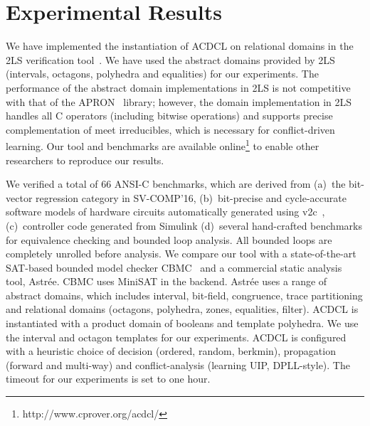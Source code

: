 

\section{Experimental Results}

We have implemented the instantiation of ACDCL on relational domains in the
2LS verification tool~\cite{2ls}.  We have used the abstract domains
provided by 2LS (intervals, octagons, polyhedra and equalities) for our
experiments.  The performance of the abstract domain implementations in 2LS
is not competitive with that of the APRON~\cite{apron} library; however, the
domain implementation in 2LS handles all C operators (including bitwise
operations) and supports precise complementation of meet irreducibles, which
is necessary for conflict-driven learning.  Our tool and benchmarks are
available online\footnote{http://www.cprover.org/acdcl/} to enable other
researchers to reproduce our results.

We verified a total of 66 ANSI-C benchmarks, which are derived from (a)~the
bit-vector regression category in SV-COMP'16, (b)~bit-precise and
cycle-accurate software models of hardware circuits automatically generated
using v2c~\cite{mtk2016}, (c)~controller code generated from Simulink
(d)~several hand-crafted benchmarks for equivalence checking and bounded
loop analysis.  All bounded loops are completely unrolled before analysis. 
We compare our tool with a state-of-the-art SAT-based bounded model checker
CBMC~\cite{cbmc} and a commercial static analysis tool, Astr{\'e}e. 
 CBMC uses MiniSAT in the
backend.  Astr{\'e}e uses a range of abstract domains, which includes
interval, bit-field, congruence, trace partitioning and relational domains
(octagons, polyhedra, zones, equalities, filter).  ACDCL is instantiated
with a product domain of booleans and template polyhedra.  We use the
interval and octagon templates for our experiments.  ACDCL is configured
with a heuristic choice of decision (ordered, random, berkmin), propagation
(forward and multi-way) and conflict-analysis (learning UIP, DPLL-style). 
The timeout for our experiments is set to one hour.
%

